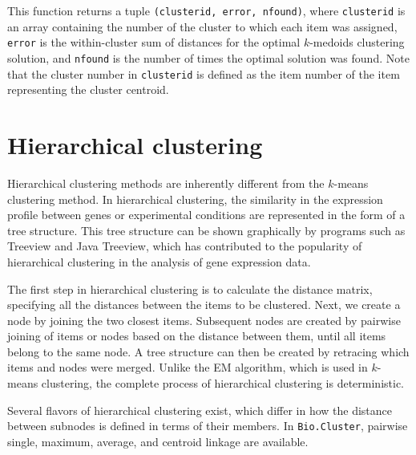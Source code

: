 \documentclass{report}
\begin{document}
This function returns a tuple \verb|(clusterid, error, nfound)|, where \verb|clusterid| is an array containing the number of the cluster to which each item was assigned, \verb|error| is the within-cluster sum of distances for the optimal $k$-medoids clustering solution, and \verb|nfound| is the number of times the optimal solution was found. Note that the cluster number in \verb|clusterid| is defined as the item number of the item representing the cluster centroid.

\section{Hierarchical clustering}

Hierarchical clustering methods are inherently different from the $k$-means clustering method. In hierarchical clustering, the similarity in the expression profile between genes or experimental conditions are represented in the form of a tree structure. This tree structure can be shown graphically by programs such as Treeview and Java Treeview, which has contributed to the popularity of hierarchical clustering in the analysis of gene expression data.

The first step in hierarchical clustering is to calculate the distance matrix, specifying all the distances between the items to be clustered. Next, we create a node by joining the two closest items. Subsequent nodes are created by pairwise joining of items or nodes based on the distance between them, until all items belong to the same node. A tree structure can then be created by retracing which items and nodes were merged. Unlike the EM algorithm, which is used in $k$-means clustering, the complete process of hierarchical clustering is deterministic.

Several flavors of hierarchical clustering exist, which differ in how the distance between subnodes is defined in terms of their members. In \verb|Bio.Cluster|, pairwise single, maximum, average, and centroid linkage are available.
\end{document}

